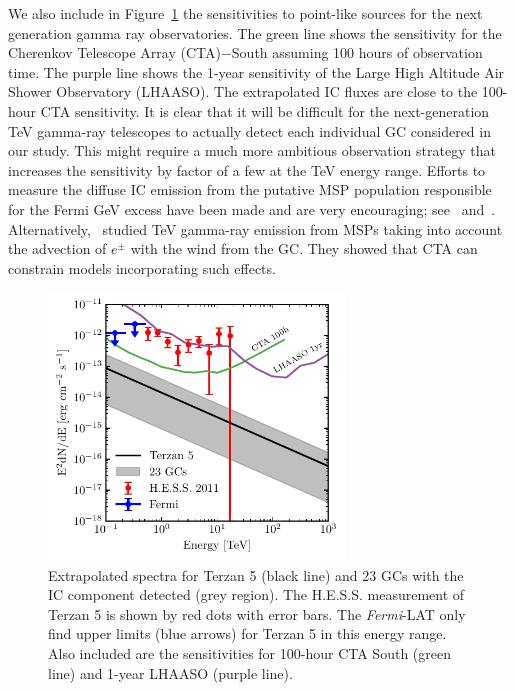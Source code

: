 \documentclass[doublespace,nopageskip]{VTthesis} %
\begin{document}
We also include in Figure~\ref{fig:TeV} the sensitivities to point-like sources for the next generation gamma ray observatories. The green line shows the sensitivity for the Cherenkov Telescope Array (CTA)$-$South assuming 100 hours of observation time. The purple line shows the 1-year sensitivity of the Large High Altitude Air Shower Observatory (LHAASO). The extrapolated IC fluxes are close to the 100-hour CTA sensitivity. It is clear that it will be difficult for the next-generation TeV gamma-ray telescopes to actually detect each individual GC considered in our study. This might require a much more ambitious observation strategy that increases the sensitivity by factor of a few at the TeV energy range.  Efforts to measure the diffuse IC emission from the putative MSP population responsible for the Fermi GeV excess have been made and are very encouraging; see~\citet{2019PhRvD..99l3020S} and~\citet{2021arXiv210205648M}. Alternatively,~\citet{2016MNRAS.458.1083B} studied TeV gamma-ray emission from MSPs taking into account the advection of $e^\pm$ with the wind from the GC. They showed that CTA can constrain models incorporating such effects. 

\begin{figure}[htb]
    \centering
    \includegraphics[width=0.7\textwidth]{Figures/Globular/TeV.pdf}
    \caption{Extrapolated spectra for Terzan 5 (black line) and 23 GCs with the IC component detected (grey region). The H.E.S.S. measurement of Terzan 5 is shown by red dots with error bars. The {\it Fermi}-LAT only find upper limits (blue arrows) for Terzan 5 in this energy range. Also included are the sensitivities for 100-hour CTA South (green line) and 1-year LHAASO (purple line).}
    \label{fig:TeV}
\end{figure}
\end{document}
